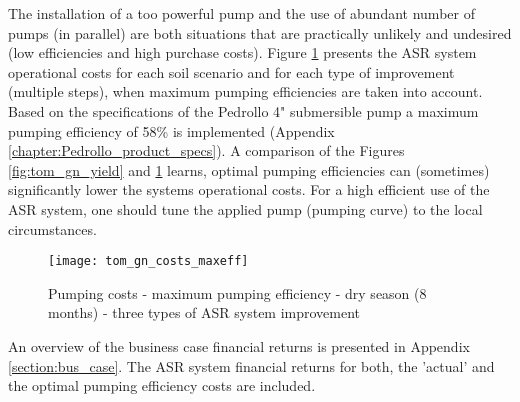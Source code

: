 The installation of a too powerful pump and the use of abundant number of pumps (in parallel) are both situations that are practically unlikely and undesired (low efficiencies and high purchase costs). Figure \ref{fig:tom_gn_yield_maxeff} presents the ASR system operational costs for each soil scenario and for each type of improvement (multiple steps), when maximum pumping efficiencies are taken into account. Based on the specifications of the Pedrollo 4" submersible pump a maximum pumping efficiency of 58\% is implemented (Appendix \ref{chapter:Pedrollo_product_specs}). A comparison of the Figures \ref{fig:tom_gn_yield} and \ref{fig:tom_gn_yield_maxeff} learns, optimal pumping efficiencies can (sometimes) significantly lower the systems operational costs. For a high efficient use of the ASR system, one should tune the applied pump (pumping curve) to the local circumstances. 





\begin{figure}[h!]
 \centering
 \texttt{[image: tom\_gn\_costs\_maxeff]}
 \captionsetup{justification=centering} 
 \caption{Pumping costs - maximum pumping efficiency - dry season (8 months) - three types of ASR system improvement}
 \label{fig:tom_gn_yield_maxeff}
\end{figure}

An overview of the business case financial returns is presented in Appendix \ref{section:bus_case}. The ASR system financial returns for both, the 'actual' and the optimal pumping efficiency costs are included. \\ 

